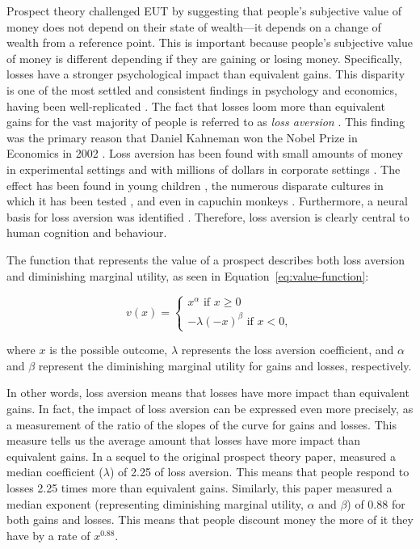 \documentclass[a4paper, nobind, dvipsnames]{templates/ociamthesis}
\theoremstyle{definition}
\theoremstyle{definition}
\theoremstyle{definition}
\theoremstyle{definition}
\theoremstyle{remark}
\begin{document}
Prospect theory \autocite{kahneman1979,tversky1992} challenged EUT by suggesting that
people's subjective value of money does not depend on their state of wealth---it
depends on a change of wealth from a reference point. This is important because
people's subjective value of money is different depending if they are gaining or
losing money. Specifically, losses have a stronger psychological impact than
equivalent gains. This disparity is one of the most settled and consistent
findings in psychology and economics, having been well-replicated \autocite[e.g,][]{ruggeri2020}. The fact that losses loom more than equivalent gains for the vast
majority of people is referred to as \emph{loss aversion} \autocite{kahneman1979}. This
finding was the primary reason that Daniel Kahneman won the Nobel Prize in
Economics in 2002 \autocite{kahneman2003}. Loss aversion has been found with small
amounts of money in experimental settings \autocite{kahneman1979,tversky1992} and with
millions of dollars in corporate settings \autocite{koller2012,swalm1966}. The effect
has been found in young children \autocite{harbaugh2001}, the numerous disparate
cultures in which it has been tested \autocite{weber1998}, and even in capuchin monkeys
\autocite{chen2006a}. Furthermore, a neural basis for loss aversion was identified
\autocite{tom2007}. Therefore, loss aversion is clearly central to human cognition and
behaviour.

The function that represents the value of a prospect describes both loss
aversion and diminishing marginal utility, as seen in
Equation~\eqref{eq:value-function}:

\begin{equation} v(x) = \left\{ \begin{array}{l} x^\alpha \text{ if } x \ge 0 \\
-\lambda(-x)^\beta \text{ if } x < 0, \label{eq:value-function} \end{array} \right.
\end{equation}

where \(x\) is the possible outcome, \(\lambda\) represents the loss aversion
coefficient, and \(\alpha\) and \(\beta\) represent the diminishing marginal utility
for gains and losses, respectively.

In other words, loss aversion means that losses have more impact than equivalent
gains. In fact, the impact of loss aversion can be expressed even more
precisely, as a measurement of the ratio of the slopes of the curve for gains
and losses. This measure tells us the average amount that losses have more
impact than equivalent gains. In a sequel to the original prospect theory paper,
\textcite{tversky1992} measured a median coefficient (\(\lambda\)) of 2.25 of loss aversion.
This means that people respond to losses 2.25 times more than equivalent gains.
Similarly, this paper measured a median exponent (representing diminishing
marginal utility, \(\alpha\) and \(\beta\)) of 0.88 for both gains and losses. This
means that people discount money the more of it they have by a rate of
\(x^{0.88}\).
\end{document}
